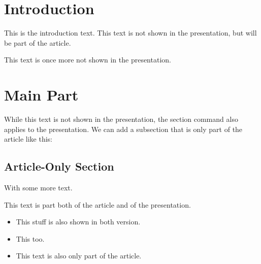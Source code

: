 \documentclass[a4paper]{article}
\begin{document}
\section{Introduction}
This is the introduction text. This text is not shown in the
presentation, but will be part of the article.
\begin{frame}
\begin{figure}
\end{figure}
\end{frame}
This text is once more not shown in the presentation.
\section{Main Part}
While this text is not shown in the presentation, the section command
also applies to the presentation.
We can add a subsection that is only part of the article like this:
\subsection<article>{Article-Only Section}
With some more text.
\begin{frame}
This text is part both of the article and of the presentation.
\begin{itemize}
\item This stuff is also shown in both version.
\item This too.
\item<presentation:only@0> This text is also only part of the article.
\end{itemize}
\end{frame}
\end{document}
